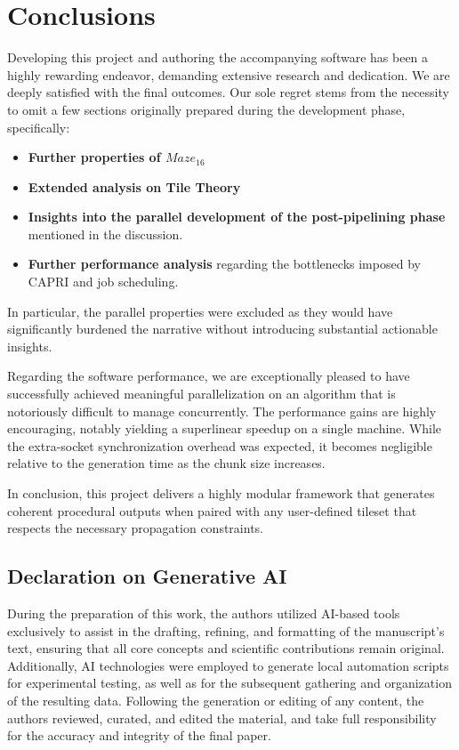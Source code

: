 \section{Conclusions}

Developing this project and authoring the accompanying software has been a highly rewarding endeavor, demanding extensive research and dedication. We are deeply satisfied with the final outcomes. Our sole regret stems from the necessity to omit a few sections originally prepared during the development phase, specifically:

\begin{itemize}
    \item \textbf{Further properties of $Maze_{16}$}
    \item \textbf{Extended analysis on Tile Theory}
    \item \textbf{Insights into the parallel development of the post-pipelining phase} mentioned in the discussion.
    \item \textbf{Further performance analysis} regarding the bottlenecks imposed by CAPRI and job scheduling.
\end{itemize}

In particular, the parallel properties were excluded as they would have significantly burdened the narrative without introducing substantial actionable insights.

Regarding the software performance, we are exceptionally pleased to have successfully achieved meaningful parallelization on an algorithm that is notoriously difficult to manage concurrently. The performance gains are highly encouraging, notably yielding a superlinear speedup on a single machine. While the extra-socket synchronization overhead was expected, it becomes negligible relative to the generation time as the chunk size increases.

In conclusion, this project delivers a highly modular framework that generates coherent procedural outputs when paired with any user-defined tileset that respects the necessary propagation constraints.

\subsection{Declaration on Generative AI}
During the preparation of this work, the authors utilized AI-based tools exclusively to assist in the drafting, refining, and formatting of the manuscript's text, ensuring that all core concepts and scientific contributions remain original. Additionally, AI technologies were employed to generate local automation scripts for experimental testing, as well as for the subsequent gathering and organization of the resulting data. Following the generation or editing of any content, the authors reviewed, curated, and edited the material, and take full responsibility for the accuracy and integrity of the final paper.

